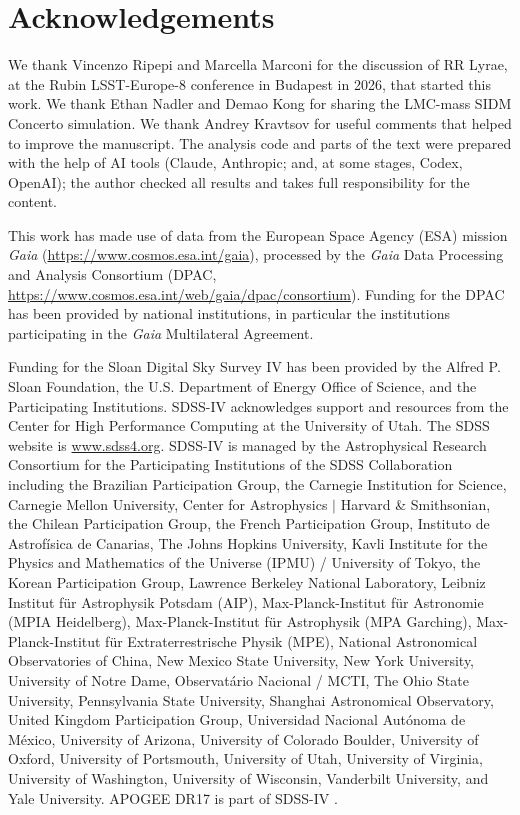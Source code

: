 \documentclass[fleqn,usenatbib,letters]{mnras}
\begin{document}
\section*{Acknowledgements}
We thank Vincenzo Ripepi and Marcella Marconi for the discussion of
RR Lyrae, at the Rubin LSST-Europe-8 conference in Budapest in 2026,
that started this work. We thank Ethan Nadler and Demao Kong for sharing the LMC-mass SIDM
Concerto simulation. We thank Andrey Kravtsov for useful comments that
helped to improve the manuscript. The analysis code and parts of the text were prepared
with the help of AI tools (Claude, Anthropic; and, at some stages, Codex,
OpenAI); the author checked all results and takes full responsibility for the
content.

This work has made use of data from the European Space Agency (ESA) mission
{\it Gaia} (\url{https://www.cosmos.esa.int/gaia}), processed by the {\it Gaia}
Data Processing and Analysis Consortium (DPAC,
\url{https://www.cosmos.esa.int/web/gaia/dpac/consortium}). Funding for the DPAC
has been provided by national institutions, in particular the institutions
participating in the {\it Gaia} Multilateral Agreement.

Funding for the Sloan Digital Sky Survey IV has been provided by the Alfred P. Sloan Foundation, the U.S. Department of Energy Office of Science, and the Participating Institutions. SDSS-IV acknowledges support and resources from the Center for High Performance Computing at the University of Utah. The SDSS website is \href{https://www.sdss4.org}{www.sdss4.org}. SDSS-IV is managed by the Astrophysical Research Consortium for the Participating Institutions of the SDSS Collaboration including the Brazilian Participation Group, the Carnegie Institution for Science, Carnegie Mellon University, Center for Astrophysics $|$ Harvard \& Smithsonian, the Chilean Participation Group, the French Participation Group, Instituto de Astrof\'isica de Canarias, The Johns Hopkins University, Kavli Institute for the Physics and Mathematics of the Universe (IPMU) / University of Tokyo, the Korean Participation Group, Lawrence Berkeley National Laboratory, Leibniz Institut f\"ur Astrophysik Potsdam (AIP), Max-Planck-Institut f\"ur Astronomie (MPIA Heidelberg), Max-Planck-Institut f\"ur Astrophysik (MPA Garching), Max-Planck-Institut f\"ur Extraterrestrische Physik (MPE), National Astronomical Observatories of China, New Mexico State University, New York University, University of Notre Dame, Observat\'ario Nacional / MCTI, The Ohio State University, Pennsylvania State University, Shanghai Astronomical Observatory, United Kingdom Participation Group, Universidad Nacional Aut\'onoma de M\'exico, University of Arizona, University of Colorado Boulder, University of Oxford, University of Portsmouth, University of Utah, University of Virginia, University of Washington, University of Wisconsin, Vanderbilt University, and Yale University. APOGEE DR17 \citep{Abdurrouf2022} is part of SDSS-IV \citep{Blanton2017,Majewski2017,Wilson2019}.
\end{document}
